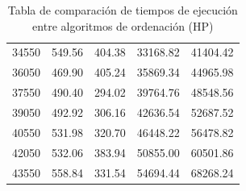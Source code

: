 \documentclass{homework}
\begin{document}
\begin{table}[H]
\begin{tabular}{|r|r|r|r|r|}
            34550 & 549.56 & 404.38 & 33168.82 & 41404.42 \\ 
            36050 & 469.90 & 405.24 & 35869.34 & 44965.98 \\ 
            37550 & 490.40 & 294.02 & 39764.76 & 48548.56 \\ 
            39050 & 492.92 & 306.16 & 42636.54 & 52687.52 \\ 
            40550 & 531.98 & 320.70 & 46448.22 & 56478.82 \\ 
            42050 & 532.06 & 383.94 & 50855.00 & 60501.86 \\ 
            43550 & 558.84 & 331.54 & 54694.44 & 68268.24 \\ 
            \hline
        \end{tabular}
        \caption{Tabla de comparación de tiempos de ejecución entre algoritmos de ordenación (HP)}
    \end{table}
\end{document}
